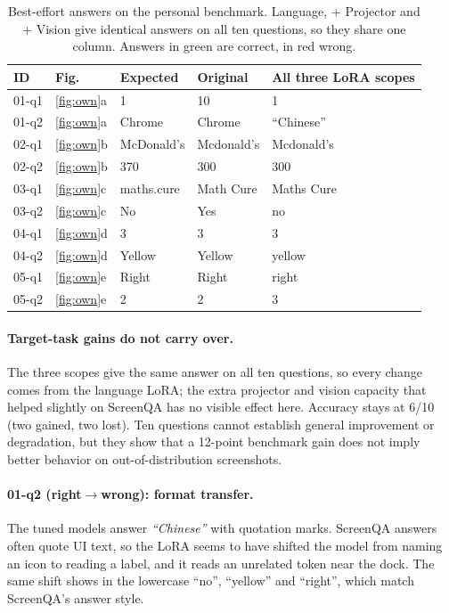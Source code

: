 \documentclass[10pt,twocolumn,letterpaper]{article}
\newcommand{\good}[1]{\textcolor{okgreen}{#1}}
\newcommand{\bad}[1]{\textcolor{badred}{#1}}
\begin{document}
\begin{table}[t]
  \centering
  \footnotesize
  \setlength{\tabcolsep}{4pt}
  \begin{tabular}{lllll}
    \toprule
    ID & Fig. & Expected & Original & All three LoRA scopes \\
    \midrule
    01-q1 & \ref{fig:own}a & 1          & \bad{10}          & \good{1} \\
    01-q2 & \ref{fig:own}a & Chrome     & \good{Chrome}     & \bad{``Chinese''} \\
    02-q1 & \ref{fig:own}b & McDonald's & \good{Mcdonald's} & \good{Mcdonald's} \\
    02-q2 & \ref{fig:own}b & 370        & \bad{300}         & \bad{300} \\
    03-q1 & \ref{fig:own}c & maths.cure & \bad{Math Cure}   & \bad{Maths Cure} \\
    03-q2 & \ref{fig:own}c & No         & \bad{Yes}         & \good{no} \\
    04-q1 & \ref{fig:own}d & 3          & \good{3}          & \good{3} \\
    04-q2 & \ref{fig:own}d & Yellow     & \good{Yellow}     & \good{yellow} \\
    05-q1 & \ref{fig:own}e & Right      & \good{Right}      & \good{right} \\
    05-q2 & \ref{fig:own}e & 2          & \good{2}          & \bad{3} \\
    \bottomrule
  \end{tabular}
  \caption{Best-effort answers on the personal benchmark. Language, + Projector and + Vision give identical answers on all ten questions, so they share one column. Answers in \good{green} are correct, in \bad{red} wrong.}
  \label{tab:transfer}
\end{table}

\paragraph{Target-task gains do not carry over.} The three scopes give the same answer on all ten questions, so every change comes from the language LoRA; the extra projector and vision capacity that helped slightly on ScreenQA has no visible effect here. Accuracy stays at 6/10 (two gained, two lost). Ten questions cannot establish general improvement or degradation, but they show that a 12-point benchmark gain does not imply better behavior on out-of-distribution screenshots.

\paragraph{01-q2 (right$\to$wrong): format transfer.} The tuned models answer \emph{``Chinese''} with quotation marks. ScreenQA answers often quote UI text, so the LoRA seems to have shifted the model from naming an icon to reading a label, and it reads an unrelated token near the dock. The same shift shows in the lowercase ``no'', ``yellow'' and ``right'', which match ScreenQA's answer style.
\end{document}
